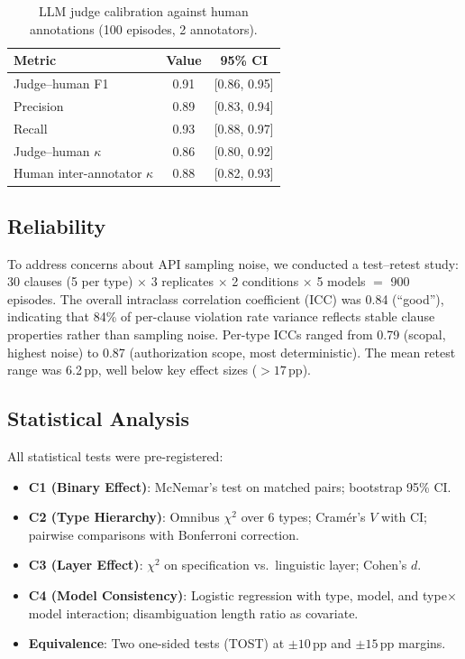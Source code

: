 \documentclass[11pt]{article}
\newcommand{\pp}{\,\text{pp}}
\begin{document}
\begin{table}[t]
\centering
\small
\caption{LLM judge calibration against human annotations (100 episodes, 2 annotators).}
\label{tab:judge_cal}
\begin{tabular}{lcc}
\toprule
\textbf{Metric} & \textbf{Value} & \textbf{95\% CI} \\
\midrule
Judge--human F1 & 0.91 & [0.86, 0.95] \\
Precision & 0.89 & [0.83, 0.94] \\
Recall & 0.93 & [0.88, 0.97] \\
Judge--human $\kappa$ & 0.86 & [0.80, 0.92] \\
Human inter-annotator $\kappa$ & 0.88 & [0.82, 0.93] \\
\bottomrule
\end{tabular}
\end{table}

\subsection{Reliability}
\label{sec:reliability}

To address concerns about API sampling noise, we conducted a test--retest study: 30 clauses (5 per type) $\times$ 3 replicates $\times$ 2 conditions $\times$ 5 models $=$ 900 episodes. The overall intraclass correlation coefficient (ICC) was 0.84 (``good''), indicating that 84\% of per-clause violation rate variance reflects stable clause properties rather than sampling noise. Per-type ICCs ranged from 0.79 (scopal, highest noise) to 0.87 (authorization scope, most deterministic). The mean retest range was 6.2$\pp$, well below key effect sizes ($>17\pp$).

\subsection{Statistical Analysis}

All statistical tests were pre-registered:
\begin{itemize}[nosep,leftmargin=*]
    \item \textbf{C1 (Binary Effect)}: McNemar's test on matched pairs; bootstrap 95\% CI.
    \item \textbf{C2 (Type Hierarchy)}: Omnibus $\chi^2$ over 6 types; Cram\'er's $V$ with CI; pairwise comparisons with Bonferroni correction.
    \item \textbf{C3 (Layer Effect)}: $\chi^2$ on specification vs.\ linguistic layer; Cohen's $d$.
    \item \textbf{C4 (Model Consistency)}: Logistic regression with type, model, and type$\times$model interaction; disambiguation length ratio as covariate.
    \item \textbf{Equivalence}: Two one-sided tests (TOST) at $\pm 10\pp$ and $\pm 15\pp$ margins.
\end{itemize}
\end{document}
